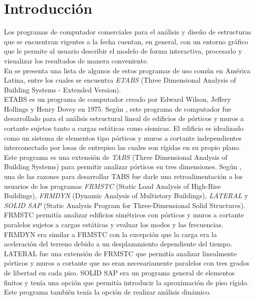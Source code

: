 \chapter{Introducción}
\label{chap:antecedentes}

Los programas de computador comerciales para el análisis y diseño de estructuras que se encuentran vigentes a la fecha cuentan, en general, con un entorno gráfico que le permite al usuario describir el modelo de forma interactiva, procesarlo y visualizar los resultados de manera conveniente.\\

En \cite{escamilla1995microcomputadores} se presenta una lista de algunos de estos programas de uso común en América Latina, entre los cuales se encuentra \emph{ETABS} (Three Dimensional Analysis of Building Systems - Extended Version).\\

ETABS es un programa de computador creado por Edward Wilson, Jeffery Hollings y Henry Dovey en 1975. Según \cite{ETABS1975}, este programa de computador fue desarrollado para el análisis estructural lineal de edificios de pórticos y muros a cortante sujetos tanto a cargas estáticas como sísmicas. El edificio es idealizado como un sistema de elementos tipo pórticos y muros a cortante independientes interconectado por losas de entrepiso las cuales son rígidas en su propio plano. \\

Este programa es una extensión de \emph{TABS} (Three Dimensional Analysis of  Building Systems) para permitir analizar pórticos en tres dimensiones. Según \cite{ETABS1972}, una de las razones para desarrollar TABS fue darle una retroalimentación a los usuarios de los programas \emph{FRMSTC} (Static Load Analysis of High-Rise Buildings), \emph{FRMDYN} (Dynamic Analysis of Multistory Buildings), \emph{LATERAL} y \emph{SOLID SAP} (Static Analysis Program for Three-Dimensional Solid Structures).\\

FRMSTC permitía analizar edificios simétricos con pórticos y muros a cortante paralelos sujetos a cargas estáticas y evaluar los modos y las frecuencias. FRMDYN era similar a FRMSTC con la excepción que la carga era la aceleración del terreno debido a un desplazamiento dependiente del tiempo. LATERAL fue una extensión de FRMSTC que permitía analizar linealmente pórticos y muros a cortante que no eran necesariamente paralelos con tres grados de libertad en cada piso. SOLID SAP era un programa general de elementos finitos y tenía una opción que permitía introducir la aproximación de piso rígido. Este programa también tenía la opción de realizar análisis dinámico.\\

